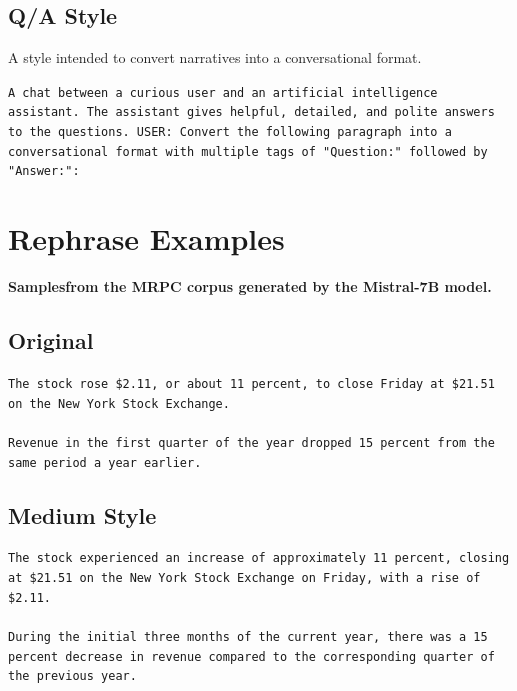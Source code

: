 \documentclass[table]{article}
\begin{document}
\subsection*{Q/A Style}
A style intended to convert narratives into a conversational format.
\begin{tcolorbox}[colback=gray!20, colframe=gray!75, rounded corners, sharp corners=northeast, sharp corners=southwest]
\texttt{A chat between a curious user and an artificial intelligence assistant. The assistant gives helpful, detailed, and polite answers to the questions. USER: Convert the following paragraph into a conversational format with multiple tags of "Question:" followed by "Answer:":}
\end{tcolorbox}

\clearpage

\section{Rephrase Examples}
\textbf{Samplesfrom the MRPC corpus generated by the Mistral-7B model.}

\subsection*{Original}
\begin{tcolorbox}[colback=gray!20, colframe=gray!75, rounded corners, sharp corners=northeast, sharp corners=southwest]
\texttt{The stock rose \$2.11, or about 11 percent, to close Friday at \$21.51 on the New York Stock Exchange.\\\\
    Revenue in the first quarter of the year dropped 15 percent from the same period a year earlier.}
\end{tcolorbox}

\subsection*{Medium Style}
\begin{tcolorbox}[colback=gray!20, colframe=gray!75, rounded corners, sharp corners=northeast, sharp corners=southwest]
\texttt{The stock experienced an increase of approximately 11 percent, closing at \$21.51 on the New York Stock Exchange on Friday, with a rise of \$2.11.\\\\
During the initial three months of the current year, there was a 15 percent decrease in revenue compared to the corresponding quarter of the previous year.}
\end{tcolorbox}
\end{document}
